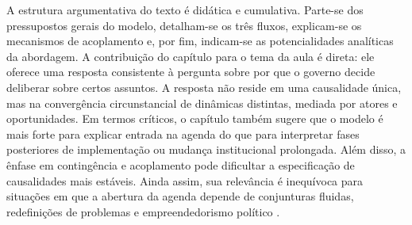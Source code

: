 \documentclass[12pt,a4paper]{article}
\begin{document}
A estrutura argumentativa do texto é didática e cumulativa. Parte-se dos pressupostos gerais do modelo, detalham-se os três fluxos, explicam-se os mecanismos de acoplamento e, por fim, indicam-se as potencialidades analíticas da abordagem. A contribuição do capítulo para o tema da aula é direta: ele oferece uma resposta consistente à pergunta sobre por que o governo decide deliberar sobre certos assuntos. A resposta não reside em uma causalidade única, mas na convergência circunstancial de dinâmicas distintas, mediada por atores e oportunidades.
Em termos críticos, o capítulo também sugere que o modelo é mais forte para explicar entrada na agenda do que para interpretar fases posteriores de implementação ou mudança institucional prolongada. Além disso, a ênfase em contingência e acoplamento pode dificultar a especificação de causalidades mais estáveis. Ainda assim, sua relevância é inequívoca para situações em que a abertura da agenda depende de conjunturas fluidas, redefinições de problemas e empreendedorismo político \autocite{capella2022multiplos}.
\end{document}

